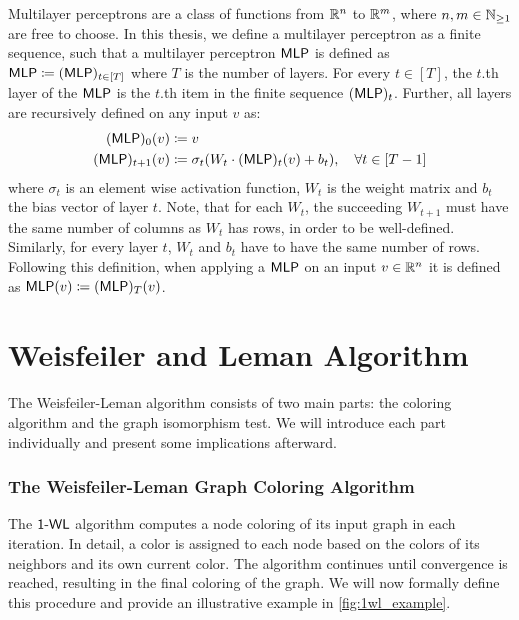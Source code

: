 \begin{definition}\label{def:mlp}
    Multilayer perceptrons are a class of functions from $\mathbb{R}^n$ to $\mathbb{R}^m$, where $n,m \in \mathbb{N}_{\geq 1}$ are free to choose. In this thesis, we define a multilayer perceptron as a finite sequence, such that a multilayer perceptron $\textsf{MLP}$ is defined as $\textsf{MLP} \coloneqq (\textsf{MLP})_{t\in[T]}$ where $T$ is the number of layers. For every $t \in [T]$, the $t$.th layer of the $\textsf{MLP}$ is the $t$.th item in the finite sequence $(\textsf{MLP})_t$. Further, all layers are recursively defined on any input $v$ as:
    \begin{align*}
        (\textsf{MLP})_{0}(v) &\coloneqq v\\
        (\textsf{MLP})_{t+1}(v) &\coloneqq \sigma_t(W_t \cdot (\textsf{MLP})_{t} (v) + b_t), \quad \forall t \in [T-1]
    \end{align*}
    where $\sigma_t$ is an element wise activation function, $W_t$ is the weight matrix and $b_t$ the bias vector of layer $t$. Note, that for each $W_t$, the succeeding $W_{t+1}$ must have the same number of columns as $W_t$ has rows, in order to be well-defined. Similarly, for every layer $t$, $W_t$ and $b_t$ have to have the same number of rows.
    Following this definition, when applying a $\textsf{MLP}$ on an input $v \in \mathbb{R}^n$ it is defined as $\textsf{MLP}(v) \coloneqq (\textsf{MLP})_T(v)$.
\end{definition}

\section{Weisfeiler and Leman Algorithm}\label{sec:1-WL Definition}
The Weisfeiler-Leman algorithm consists of two main parts: the coloring algorithm and the graph isomorphism test. We will introduce each part individually and present some implications afterward.

\subsubsection{The Weisfeiler-Leman Graph Coloring Algorithm}
The $\textsf{1-WL}$ algorithm computes a node coloring of its input graph in each iteration. In detail, a color is assigned to each node based on the colors of its neighbors and its own current color. The algorithm continues until convergence is reached, resulting in the final coloring of the graph. We will now formally define this procedure and provide an illustrative example in \cref{fig:1wl_example}.


